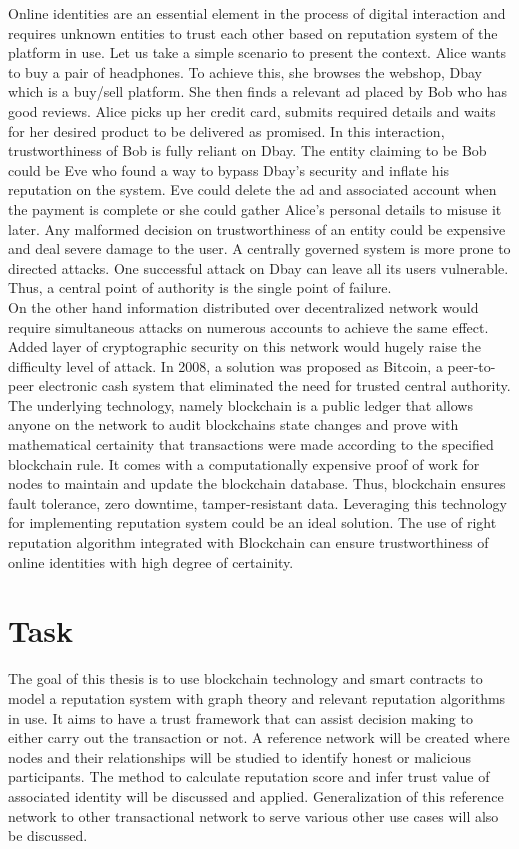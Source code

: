 \documentclass[a4paper,11pt,dvipsnames]{article}
\begin{document}
	Online identities are an essential element in the process of digital 
	interaction and requires unknown entities to trust each other based on 
	reputation system of the platform in use. Let us take a simple
	scenario to present the context. Alice wants to buy a pair of 
	headphones. To achieve this, she browses the webshop, Dbay which is 
	a buy/sell platform. She then finds a relevant ad placed by Bob who 
	has good reviews. Alice picks up her credit card, submits required 
	details and waits for her desired product to be delivered as promised. 
	In this interaction, trustworthiness of Bob is fully reliant on Dbay. 
	The entity claiming to be Bob could be Eve who found a way to bypass 
	Dbay’s security and inflate his reputation on the system. Eve could 
	delete the ad and associated account when the payment is complete or 
	she could gather Alice’s personal details to misuse it later. Any 
	malformed decision on trustworthiness of an entity could be expensive 
	and deal severe damage to the user. A centrally governed system is more 
	prone to directed attacks. One successful attack on Dbay can leave 
	all its users vulnerable. Thus, a central point of authority is the 
	single point of failure.\\
	On the other hand information distributed over decentralized network 
	would require simultaneous attacks on numerous accounts to achieve 
	the same effect. Added layer of cryptographic security on this 
	network would hugely raise the difficulty level of attack. In 2008, 
	a solution was proposed as Bitcoin, a peer-to-peer electronic cash 
	system \cite{Bitcoin_Satoshi} that eliminated the need for trusted central 
	authority. The underlying technology, namely blockchain is a public 
	ledger that allows anyone on the network to audit blockchains state 
	changes and prove with mathematical certainity that transactions were 
	made according to the specified blockchain rule.
	\cite{enoughBitcoinForEthereum} It comes with a computationally expensive 
	proof of work for nodes to maintain and update the blockchain database. 
	Thus, blockchain ensures fault tolerance, zero downtime, tamper-resistant 
	data. Leveraging this technology for implementing reputation system
	could be an ideal solution. The use of right reputation algorithm 
	integrated with Blockchain can ensure trustworthiness of online 
	identities with high degree of certainity.	
	
	\section*{Task}
	The goal of this thesis is to use blockchain technology and smart contracts 
	to model a reputation system with graph theory and relevant reputation 
	algorithms in use. It aims to have a trust framework that can assist 
	decision making to either carry out the transaction or not.
	A reference network will be created where nodes and their relationships 
	will be studied to identify honest or malicious participants. The method to 
	calculate reputation score and infer trust value of associated identity 
	will be discussed and applied. Generalization of this reference network to 
	other transactional network to serve various other use cases will also be 
	discussed. 
\end{document}
